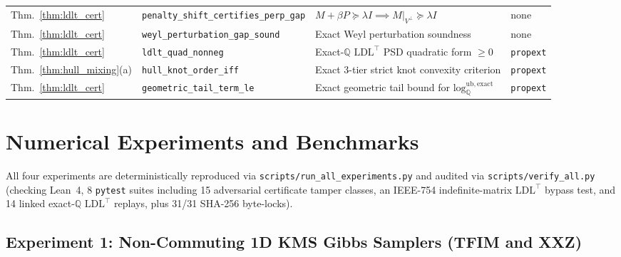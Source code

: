 \documentclass[11pt,a4paper]{article}
\theoremstyle{definition}
\newcommand{\Q}{\mathbb{Q}}
\begin{document}
\begin{table}[t]
{\begin{tabular}{@{}llll@{}}
Thm.~\ref{thm:ldlt_cert} & \texttt{penalty\_shift\_certifies\_perp\_gap} & $M + \beta P \succeq \lambda I \implies M|_{V^\perp} \succeq \lambda I$ & none \\
Thm.~\ref{thm:ldlt_cert} & \texttt{weyl\_perturbation\_gap\_sound} & Exact Weyl perturbation soundness & none \\
Thm.~\ref{thm:ldlt_cert} & \texttt{ldlt\_quad\_nonneg} & Exact-$\Q$ $\mathrm{LDL}^\top$ PSD quadratic form $\ge 0$ & \texttt{propext} \\
Thm.~\ref{thm:hull_mixing}(a) & \texttt{hull\_knot\_order\_iff} & Exact 3-tier strict knot convexity criterion & \texttt{propext} \\
Thm.~\ref{thm:ldlt_cert} & \texttt{geometric\_tail\_term\_le} & Exact geometric tail bound for $\mathrm{log}_{\Q}^{\mathrm{ub,exact}}$ & \texttt{propext} \\
\bottomrule
\end{tabular}%
}
\end{table}

\section{Numerical Experiments and Benchmarks}
\label{sec:experiments}

All four experiments are deterministically reproduced via \texttt{scripts/run\_all\_experiments.py} and audited via \texttt{scripts/verify\_all.py} (checking Lean~4, 8 \texttt{pytest} suites including 15 adversarial certificate tamper classes, an IEEE-754 indefinite-matrix $\mathrm{LDL}^\top$ bypass test, and 14 linked exact-$\Q$ $\mathrm{LDL}^\top$ replays, plus 31/31 SHA-256 byte-locks).

\subsection{Experiment 1: Non-Commuting 1D KMS Gibbs Samplers (TFIM and XXZ)}
\end{document}
